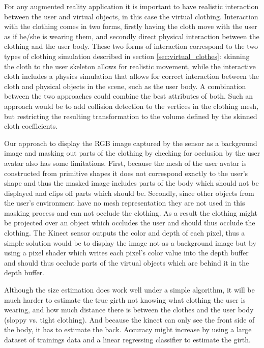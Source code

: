 \documentclass[twocolumn,a4paper]{article}
\begin{document}
For any augmented reality application it is important to have realistic interaction between the user and virtual objects, in this case the virtual clothing. Interaction with the clothing comes in two forms, firstly having the cloth move with the user as if he/she is wearing them, and secondly direct physical interaction between the clothing and the user body. These two forms of interaction correspond to the two types of clothing simulation described in section \ref{sec:virtual_clothes}: skinning the cloth to the user skeleton allows for realistic movement, while the interactive cloth includes a physics simulation that allows for correct interaction between the cloth and physical objects in the scene, such as the user body. A combination between the two approaches could combine the best attributes of both. Such an approach would be to add collision detection to the vertices in the clothing mesh, but restricting the resulting transformation to the volume defined by the skinned cloth coefficients.

Our approach to display the RGB image captured by the sensor as a background image and masking out parts of the clothing by checking for occlusion by the user avatar also has some limitations. First, because the mesh of the user avatar is constructed from primitive shapes it does not correspond exactly to the user's shape and thus the masked image includes parts of the body which should not be displayed and clips off parts which should be. Secondly, since other objects from the user's environment have no mesh representation they are not used in this masking process and can not occlude the clothing. As a result the clothing might be projected over an object which occludes the user and should thus occlude the clothing. The Kinect sensor outputs the color and depth of each pixel, thus a simple solution would be to display the image not as a background image but by using a pixel shader which writes each pixel's color value into the depth buffer and should thus occlude parts of the virtual objects which are behind it in the depth buffer.

Although the size estimation does work well under a simple algorithm, it will be much harder to estimate the true girth not knowing what clothing the user is wearing, and how much distance there is between the clothes and the user body (sloppy vs. tight clothing). And because the kinect can only see the front side of the body, it has to estimate the back. 
Accuracy might increase by using a large dataset of trainings data and a linear regressing classifier to estimate the girth.
\end{document}
